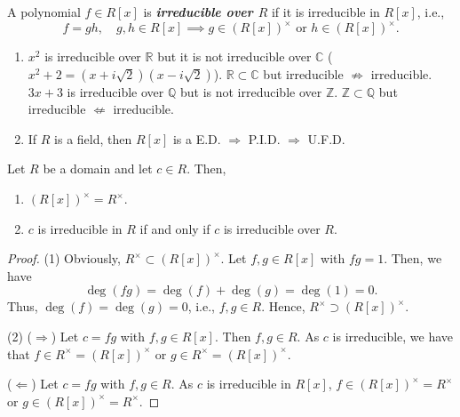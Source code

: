 \documentclass[twoside]{article}
\newcommand\Z{\mathbb Z}
\newcommand\Q{\mathbb Q}
\newcommand\R{\mathbb R}
\newcommand\C{\mathbb C}
\theoremstyle{remark}
\newcommand*\term[1]{\textbf{\textit{\mathversion{bold}#1}}}
\begin{document}
\begin{definition}%
  A polynomial \(f \in R[x]\) is \term{irreducible over \(R\)} if it is irreducible in \(R[x]\), i.e.,
  \[ f = gh, \quad g,h \in R[x] \implies g \in (R[x])^\times \text{ or } h \in (R[x])^\times. \]
\end{definition}

\begin{examples}
  \begin{enumerate}[label=\arabic*.]
    \item \(x^2\) is irreducible over \(\R\) but it is not irreducible over \(\C\) (\(x^2 + 2 = (x + i\sqrt 2)(x - i\sqrt 2)\)). \(\R \subset \C\) but irreducible \(\not\Rightarrow\) irreducible. \\
    \(3x+3\) is irreducible over \(\Q\) but is not irreducible over \(\Z\). \(\Z \subset \Q\) but irreducible \(\not\Leftarrow\) irreducible.
    \item If \(R\) is a field, then \(R[x]\) is a E.D. \(\Rightarrow\) P.I.D. \(\Rightarrow\) U.F.D.\@
  \end{enumerate}
\end{examples}

\begin{lemma}
  Let \(R\) be a domain and let \(c \in R\). Then,
  \begin{enumerate}[label=\textup{(\arabic*)}, nosep]
    \item \((R[x])^\times = R^\times\).
    \item \(c\) is irreducible in \(R\) if and only if \(c\) is irreducible over \(R\).
  \end{enumerate}
\end{lemma}

\begin{proof}
  (1) Obviously, \(R^\times \subset (R[x])^\times\). Let \(f, g \in R[x]\) with \(fg = 1\). Then, we have
  \[ \deg(fg) = \deg(f) + \deg(g) = \deg(1) = 0. \]
  Thus, \(\deg(f) = \deg(g) = 0\), i.e., \(f,g \in R\). Hence, \(R^\times \supset (R[x])^\times\).
  
  (2) (\(\Rightarrow\)) Let \(c = fg\) with \(f,g \in R[x]\). Then \(f,g \in R\). As \(c\) is irreducible, we have that \(f \in R^\times = (R[x])^\times\) or \(g \in R^\times = (R[x])^\times\). \par
  (\(\Leftarrow\)) Let \(c = fg\) with \(f,g \in R\). As \(c\) is irreducible in \(R[x]\), \(f \in (R[x])^\times = R^\times\) or \(g \in (R[x])^\times = R^\times\).
\end{proof}
\end{document}
